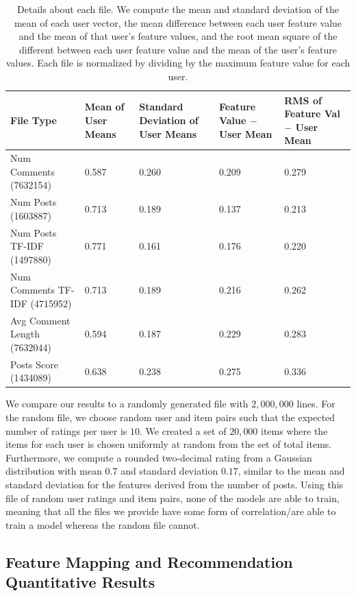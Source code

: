 \documentclass{article}
\begin{document}
\begin{table}
    \begin{tabular}{ |p{2.5cm}|p{2cm}|p{3cm}|p{3cm}|p{2.5cm}|}
    \hline
    File Type& Mean of User Means & Standard Deviation of User Means & Feature Value $-$ User Mean & RMS of Feature Val $-$ User Mean\\ \hline\hline
    Num Comments (7632154)& 0.587 & 0.260 & 0.209 & 0.279 \\ \hline
    Num Posts (1603887)& 0.713 & 0.189 & 0.137 & 0.213 \\ \hline
    Num Posts TF-IDF (1497880) & 0.771 & 0.161 &  0.176 & 0.220 \\ \hline
    Num Comments TF-IDF (4715952) & 0.713 & 0.189 & 0.216 & 0.262 \\ \hline
    Avg Comment Length (7632044) & 0.594 & 0.187 & 0.229 & 0.283 \\ \hline
    Posts Score (1434089) & 0.638 & 0.238 & 0.275 & 0.336 \\
    \hline
    \end{tabular}
    \caption{Details about each file. We compute the mean and standard deviation of the mean of each user vector,
     the mean difference between each user feature value and the mean of that user's feature values, and the root mean
     square of the different between each user feature value and the mean of the user's feature values. 
     Each file is normalized by dividing by the maximum feature value for each user.}\label{dataset-chars}
\end{table}

We compare our results to a randomly generated file with $2,000,000$ lines. For the random file, we choose random user and item pairs such that the expected number of ratings per user is $10$. We created a set of $20,000$ items
where the items for each user is chosen uniformly at random from the set of total items. Furthermore, we compute a 
rounded two-decimal rating from a Gaussian distribution with mean $0.7$ and standard deviation $0.17$, similar to the mean and standard deviation for the features derived from the number of posts. Using this
file of random user ratings and item pairs, none of the models are able to train, meaning that all the files
we provide have some form of correlation/are able to train a model whereas the random file cannot.

\subsection{Feature Mapping and Recommendation Quantitative Results}\label{sec:feature-mapping}
\end{document}

